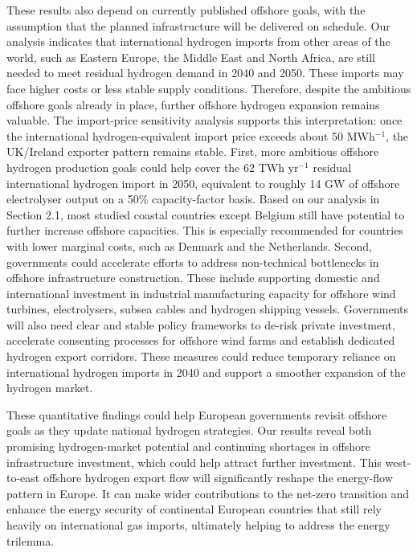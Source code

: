 \documentclass[pdflatex,lineno,sn-mathphys,Numbered]{sn-jnl}%
\begin{document}
These results also depend on currently published offshore goals, with the assumption that the planned infrastructure will be delivered on schedule.
Our analysis indicates that international hydrogen imports from other areas of the world, such as Eastern Europe, the Middle East and North Africa, are still needed to meet residual hydrogen demand in 2040 and 2050. These imports may face higher costs or less stable supply conditions. Therefore, despite the ambitious offshore goals already in place, further offshore hydrogen expansion remains valuable.
The import-price sensitivity analysis supports this interpretation: once the international hydrogen-equivalent import price exceeds about 50 \texteuro{} MWh$^{-1}$, the UK/Ireland exporter pattern remains stable.
First, more ambitious offshore hydrogen production goals could help cover the 62 TWh yr$^{-1}$ residual international hydrogen import in 2050, equivalent to roughly 14 GW of offshore electrolyser output on a 50\% capacity-factor basis. Based on our analysis in Section 2.1, most studied coastal countries except Belgium still have potential to further increase offshore capacities. This is especially recommended for countries with lower marginal costs, such as Denmark and the Netherlands.
Second, governments could accelerate efforts to address non-technical bottlenecks in offshore infrastructure construction. These include supporting domestic and international investment in industrial manufacturing capacity for offshore wind turbines, electrolysers, subsea cables and hydrogen shipping vessels. Governments will also need clear and stable policy frameworks to de-risk private investment, accelerate consenting processes for offshore wind farms and establish dedicated hydrogen export corridors. These measures could reduce temporary reliance on international hydrogen imports in 2040 and support a smoother expansion of the hydrogen market.

These quantitative findings could help European governments revisit offshore goals as they update national hydrogen strategies. Our results reveal both promising hydrogen-market potential and continuing shortages in offshore infrastructure investment, which could help attract further investment.
This west-to-east offshore hydrogen export flow will significantly reshape the energy-flow pattern in Europe.
It can make wider contributions to the net-zero transition and enhance the energy security of continental European countries that still rely heavily on international gas imports, ultimately helping to address the energy trilemma.
\end{document}

